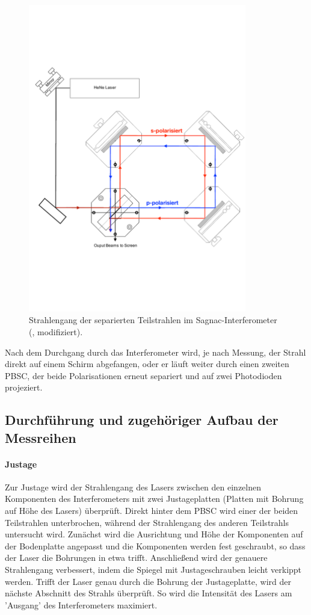 \begin{figure}[h!]
  \centering
  \includegraphics[width=0.85\textwidth]{content/images/interferometer_teil.pdf}
  \caption{Strahlengang der separierten Teilstrahlen im Sagnac-Interferometer  (\cite{teachspin}, modifiziert).}
  \label{fig:int_teil}
\end{figure}
Nach dem Durchgang durch das Interferometer wird, je nach Messung, der Strahl direkt auf einem Schirm abgefangen, oder er läuft weiter durch einen zweiten PBSC, der beide Polarisationen erneut separiert und auf zwei Photodioden projeziert.
\FloatBarrier

\subsection{Durchführung und zugehöriger Aufbau der Messreihen}
\paragraph{Justage}
Zur Justage wird der Strahlengang des Lasers zwischen den einzelnen Komponenten des Interferometers mit zwei Justageplatten (Platten mit Bohrung auf Höhe des Lasers) überprüft.
Direkt hinter dem PBSC wird einer der beiden Teilstrahlen unterbrochen, während der Strahlengang des anderen Teilstrahls untersucht wird.
Zunächst wird die Ausrichtung und Höhe der Komponenten auf der Bodenplatte angepasst und die Komponenten werden fest geschraubt, so dass der Laser die Bohrungen in etwa trifft.
Anschließend wird der genauere Strahlengang verbessert, indem die Spiegel mit Justageschrauben leicht verkippt werden.
Trifft der Laser genau durch die Bohrung der Justageplatte, wird der nächste Abschnitt des Strahls überprüft.
So wird die Intensität des Lasers am 'Ausgang' des Interferometers maximiert.


